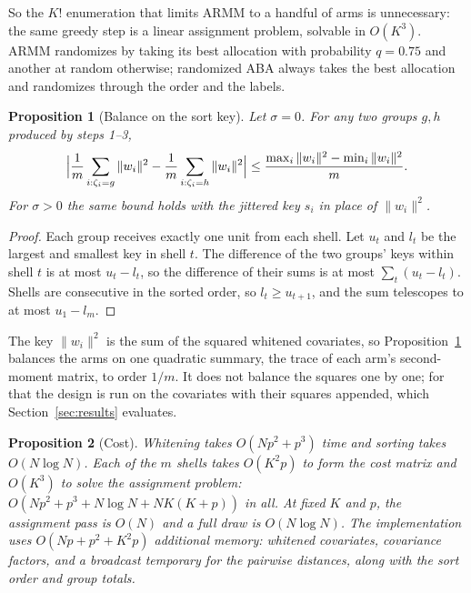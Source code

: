 \documentclass[11pt]{article}
\newtheorem{proposition}{Proposition}
\theoremstyle{remark}
\begin{document}
So the $K!$ enumeration that limits ARMM to a handful of arms is
unnecessary: the same greedy step is a linear assignment problem, solvable
in $O(K^3)$. ARMM randomizes by taking its best allocation with probability
$q = 0.75$ and another at random otherwise; randomized ABA always takes the
best allocation and randomizes through the order and the labels.

\begin{proposition}[Balance on the sort key]\label{prop:key}
Let $\sigma = 0$. For any two groups $g, h$ produced by steps 1--3,
\[
\Bigl|\frac1m \sum_{i: \zeta_i = g} \|w_i\|^2 - \frac1m \sum_{i: \zeta_i = h}
\|w_i\|^2\Bigr| \le \frac{\max_i \|w_i\|^2 - \min_i \|w_i\|^2}{m}.
\]
For $\sigma > 0$ the same bound holds with the jittered key $s_i$ in place of
$\|w_i\|^2$.
\end{proposition}

\begin{proof}
Each group receives exactly one unit from each shell. Let $u_t$ and $l_t$ be
the largest and smallest key in shell $t$. The difference of the two groups'
keys within shell $t$ is at most $u_t - l_t$, so the difference of their sums
is at most $\sum_t (u_t - l_t)$. Shells are consecutive in the sorted order,
so $l_t \ge u_{t+1}$, and the sum telescopes to at most $u_1 - l_m$.
\end{proof}

The key $\|w_i\|^2$ is the sum of the squared whitened covariates, so
Proposition~\ref{prop:key} balances the arms on one quadratic summary, the
trace of each arm's second-moment matrix, to order $1/m$. It does not balance
the squares one by one; for that the design is run on the covariates with
their squares appended, which Section~\ref{sec:results} evaluates.

\begin{proposition}[Cost]\label{prop:cost}
Whitening takes $O(Np^2 + p^3)$ time and sorting takes $O(N \log N)$.
Each of the $m$ shells takes $O(K^2 p)$ to form the cost
matrix and $O(K^3)$ to solve the assignment problem: $O(Np^2 + p^3 + N \log N +
NK(K + p))$ in all. At fixed $K$ and $p$, the assignment pass is $O(N)$
and a full draw is $O(N \log N)$. The implementation uses
$O(Np + p^2 + K^2p)$ additional memory: whitened covariates, covariance
factors, and a broadcast temporary for the pairwise distances, along with
the sort order and group totals.
\end{proposition}
\end{document}
